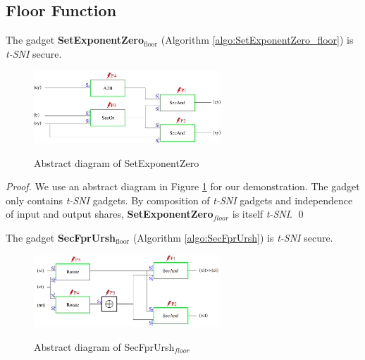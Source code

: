 \documentclass[runningheads]{llncs}
\begin{document}
\subsection{Floor Function}
\begin{lemma}
  The gadget \textbf{SetExponentZero$_\text{floor}$} (Algorithm \ref{algo:SetExponentZero_floor}) is \emph{t-SNI} secure.
\end{lemma}
\begin{figure}[ht]
  \centering
  \includegraphics[width=7cm]{figure/SetExZero2.pdf}
  \label{fig:SetExponentZero}
  \caption{Abstract diagram of SetExponentZero}
\end{figure}
\begin{proof}
  We use an abstract diagram in Figure \ref{fig:SetExponentZero} for our demonstration. The gadget only contains \emph{t-SNI} gadgets. By composition of \emph{t-SNI} gadgets and independence of input and output shares, \textbf{SetExponentZero$_{floor}$} is itself \emph{t-SNI}. \hfill \qed
\end{proof}

\begin{lemma}
  The gadget \textbf{SecFprUrsh$_\text{floor}$} (Algorithm \ref{algo:SecFprUrsh}) is \emph{t-SNI} secure.
\end{lemma}

\begin{figure}[ht]
  \centering
  \includegraphics[width=7cm]{figure/secfprurshmod.png}
  \label{fig:Secfprurshmod}
  \caption{Abstract diagram of SecFprUrsh$_{floor}$}
\end{figure}
\end{document}

